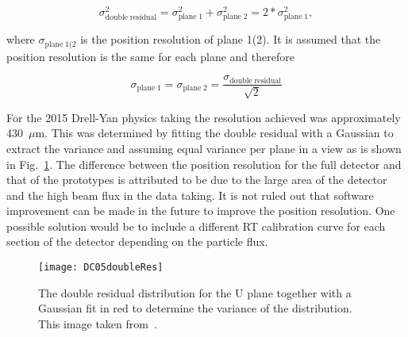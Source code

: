 \begin{equation}
\sigma_{\mathrm{double \; residual}}^2 = \sigma_{\mathrm{plane \; 1}}^2 +
\sigma_{\mathrm{plane \; 2}}^2 = 2*\sigma_{\mathrm{plane \; 1}}^2,
\end{equation}

\noindent
where $\sigma_{\mathrm{plane \; 1(2}}$ is the position resolution of plane 1(2).
It is assumed that the position resolution is the same for each plane and
therefore

\begin{equation}
\sigma_{\mathrm{plane \; 1}} = \sigma_{\mathrm{plane \; 2}} =
\frac{\sigma_{\mathrm{double \; residual}}}{\sqrt{2}}
\end{equation}

\noindent
For the 2015 Drell-Yan physics taking the resolution achieved was approximately
430~$\mu$m. This was determined by fitting the double residual with a Gaussian
to extract the variance and assuming equal variance per plane in a view as is
shown in Fig.~\ref{fig::DC05doubleRes}.  The difference between the position
resolution for the full detector and that of the prototypes is attributed to be
due to the large area of the detector and the high beam flux in the data taking.
It is not ruled out that software improvement can be made in the future to
improve the position resolution.  One possible solution would be to include a
different RT calibration curve for each section of the detector depending on the
particle flux.

\begin{figure}[h!t]
  \centering \texttt{[image: DC05doubleRes]}
  \caption{The double residual distribution for the U plane together with a
    Gaussian fit in red to determine the variance of the distribution.  This
    image taken from~\cite{heitzDC05Spin}.}
  \label{fig::DC05doubleRes}
\end{figure}

